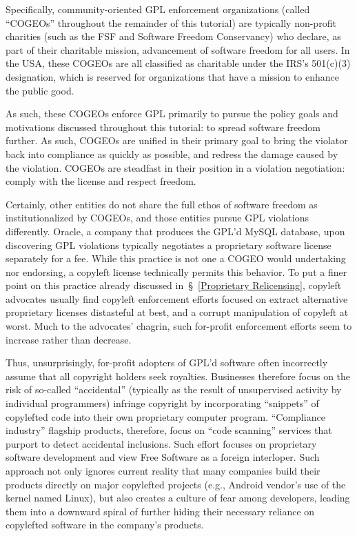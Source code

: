 Specifically, community-oriented GPL enforcement organizations (called
``COGEOs'' throughout the remainder of this tutorial) are typically
non-profit charities (such as the FSF and Software Freedom Conservancy) who
declare, as part of their charitable mission, advancement of software freedom
for all users.  In the USA, these COGEOs are all classified as charitable
under the IRS's 501(c)(3) designation, which is reserved for organizations
that have a mission to enhance the public good.

As such, these COGEOs enforce GPL primarily to pursue the policy goals and
motivations discussed throughout this tutorial: to spread software freedom
further.  As such, COGEOs are unified in their primary goal to bring the
violator back into compliance as quickly as possible, and redress the damage
caused by the violation.  COGEOs are steadfast in their position in a
violation negotiation: comply with the license and respect freedom.

Certainly, other entities do not share the full ethos of software freedom as
institutionalized by COGEOs, and those entities pursue GPL violations
differently.  Oracle, a company that produces the GPL'd MySQL database, upon
discovering GPL violations typically negotiates a proprietary software
license separately for a fee.  While this practice is not one a COGEO would
undertaking nor endorsing, a copyleft license technically permits this
behavior.  To put a finer point on this practice already discussed
in~\S~\ref{Proprietary Relicensing}, copyleft advocates usually find copyleft
enforcement efforts focused on extract alternative proprietary licenses
distasteful at best, and a corrupt manipulation of copyleft at worst.  Much
to the advocates' chagrin, such for-profit enforcement efforts seem to
increase rather than decrease.

Thus, unsurprisingly, for-profit adopters of GPL'd software often incorrectly
assume that all copyright holders seek royalties.  Businesses therefore focus
on the risk of so-called ``accidental'' (typically as the result of
unsupervised activity by individual programmers) infringe copyright by
incorporating ``snippets'' of copylefted code into their own proprietary
computer program.  ``Compliance industry'' flagship products, therefore,
focus on ``code scanning'' services that purport to detect accidental
inclusions.  Such effort focuses on proprietary software development and view
Free Software as a foreign interloper.  Such approach not only ignores
current reality that many companies build their products directly on major
copylefted projects (e.g., Android vendor's use of the kernel named Linux),
but also creates a culture of fear among developers, leading them into a
downward spiral of further hiding their necessary reliance on copylefted
software in the company's products.

